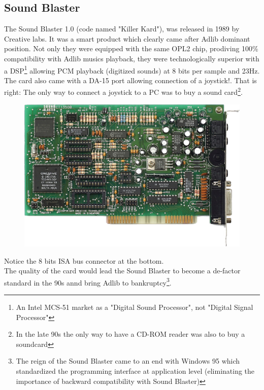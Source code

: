 \documentclass[book.tex]{subfiles}
\begin{document}
  \subsection{Sound Blaster}
  The Sound Blaster 1.0 (code named "Killer Kard"), was released in 1989 by Creative labs. It was a smart product which clearly came after Adlib dominant position. Not only they were equipped with the same OPL2 chip, prodiving 100\% compatibility with Adlib musics playback, they were technologically superior with a DSP\footnote{An Intel MCS-51 market as a "Digital Sound Processor", not "Digital Signal Processor"}  allowing PCM playback (digitized sounds) at 8 bits per sample and 23Hz. The card also came with a DA-15 port allowing connection of a joystick!. That is right: The only way to connect a joystick to a PC was to buy a sound card\footnote{In the late 90s the only way to have a CD-ROM reader was also to buy a soundcard}.\\ 
\par

\begin{figure}[H] \centering \includegraphics[width=\textwidth]{screenshots/hardware/sb.png} \end{figure}
 Notice the 8 bits ISA bus connector at the bottom.\\
   The quality of the card would lead the Sound Blaster to become a de-factor standard in the 90s annd bring Adlib to bankruptcy\footnote{The reign of the Sound Blaster came to an end with Windows 95 which standardized the programming interface at application level (eliminating the importance of backward compatibility with Sound Blaster)}.
\end{document}
